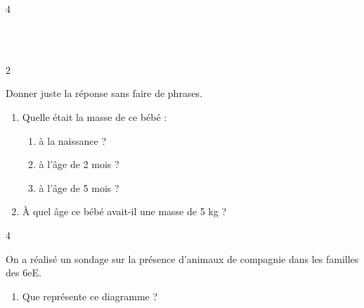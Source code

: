\documentclass[a4paper]{book}
\begin{document}
{\begin{exerciceNote}{4}
\begin{enumerate}
            \points[38] \\ \points[38] \\ \points[38]
        \end{enumerate}
    \end{exerciceNote}


    \begin{exerciceNote}{2}
        \begin{minipage}{0.5\linewidth}
            Donner juste la réponse sans faire de phrases.
            \begin{enumerate}
                \item Quelle était la masse de ce bébé :
                \begin{enumerate}
                    \item à la naissance ? \points[5]
                    \item à l'âge de 2 mois ? \points[5]
                    \item à l'âge de 5 mois ? \points[5]
                \end{enumerate}
                \item À quel âge ce bébé avait-il une masse de 5 kg ? \points[2]
            \end{enumerate}
        \end{minipage}
        \hfill
        \begin{minipage}{0.49\linewidth}
            \begin{center}
            \end{center}
        \end{minipage}   
    \end{exerciceNote}


    \begin{exerciceNote}{4}  
        \begin{minipage}{0.4\linewidth}
            \begin{center}
            \end{center}
        \end{minipage}
        \hfill
        \begin{minipage}{0.55\linewidth}
            On a réalisé un sondage sur la présence d'animaux de compagnie dans les familles des 6eE.
            
            \begin{enumerate}
                \item Que représente ce diagramme ? 


\end{enumerate}
\end{minipage}
\end{exerciceNote}}
\end{document}
